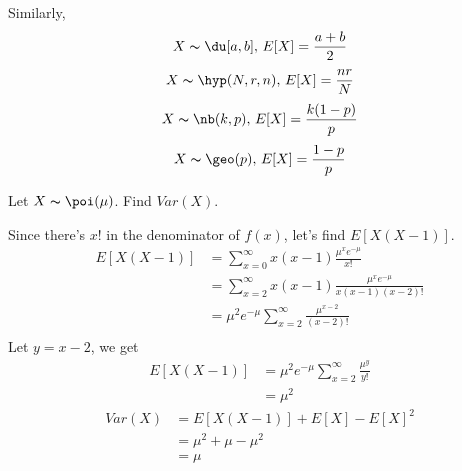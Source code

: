 Similarly,
\[ X \thicksim \du[a,b],\, E[X]=\frac{a+b}{2} \]
\[ X \thicksim \hyp(N,r,n),\, E[X]=\frac{nr}{N} \]
\[ X \thicksim \nb(k,p),\,E[X]=\frac{k(1-p)}{p} \]
\[ X \thicksim \geo(p),\,E[X]=\frac{1-p}{p} \]

Let $ X \thicksim \poi(\mu) $. Find $ Var(X) $.

Since there's $ x! $ in the denominator of $ f(x) $, let's find
$ E[X(X-1)] $.
\begin{align*}
    E[X(X-1)]&=\sum\limits_{x=0}^{\infty}x(x-1)\frac{\mu^xe^{-\mu}}{x!}\\
    &=\sum\limits_{x=2}^{\infty}x(x-1)\frac{\mu^xe^{-\mu}}{x(x-1)(x-2)!}\\
    &=\mu^2e^{-\mu}\sum\limits_{x=2}^{\infty} \frac{\mu^{x-2}}{(x-2)!}\\
\end{align*}
Let $ y=x-2 $, we get
\begin{align*}
    E[X(X-1)]&=\mu^2e^{-\mu}\sum\limits_{x=2}^{\infty} \frac{\mu^{y}}{y!}\\
    &=\mu^2
\end{align*}
\begin{align*}
    Var(X)&=E[X(X-1)]+E[X]-E[X]^2\\
    &=\mu^2+\mu-\mu^2\\
    &=\mu
\end{align*}

